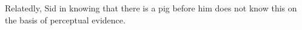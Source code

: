 % 
% 
% 
% 
Relatedly, Sid in knowing that there is a pig before him does not know this on the basis of perceptual evidence.
